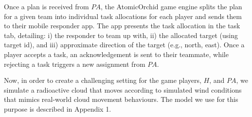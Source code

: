 Once a plan is received from $PA$, the AtomicOrchid game engine splits the plan for a given team into individual task allocations for each player and sends them to their mobile responder app. The app presents the task allocation in the task tab, detailing: i) the responder to team up with, ii) the allocated target (using target id), and iii) approximate direction of the target (e.g., north, east).  Once a player accepts a task, an acknowledgement is sent to their teammate, while rejecting a task triggers a new assignment from $PA$. 

Now, in order to create a challenging setting for the game players, $H$, and $PA$, we simulate a radioactive cloud that moves according to simulated wind conditions that mimics real-world cloud movement behaviours. The model we use for this purpose is described in Appendix 1.


